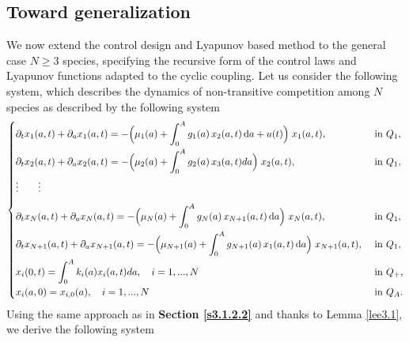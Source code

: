 \documentclass[10pt, a4paper]{amsart}
\theoremstyle{plain}
\theoremstyle{definition}
\theoremstyle{remark}
\numberwithin{equation}{section}
\begin{document}
\subsection{\bf Toward generalization}
We now extend the control design and Lyapunov based method to the general case  \texorpdfstring{$N \ge 3$}{N ≥ 3} species, specifying the recursive form of the control laws and Lyapunov functions adapted to the cyclic coupling.  Let us consider the following system, which describes the dynamics of non-transitive competition among $N$ species as described by the following system 
\begin{align}\label{aq3.145}
 \begin{cases}
\displaystyle 
\partial_t x_1(a,t) + \partial_a x_1(a,t)
= -\Bigl(\mu_1(a) 
       + \int_0^A g_1(a)\,x_2(a,t)\,\mathrm{d}a
       + u(t)\Bigr)\;x_1(a,t),
& \text{ in } Q_1,\\[8pt]
\displaystyle 
\partial_t x_2(a,t) + \partial_a x_2(a,t)
= -\Bigl(\mu_2(a) 
       + \int_0^A g_2(a)\,x_3(a,t)da\Bigr)\;x_2(a,t),
& \text{ in } Q_1,\\[8pt]
\vdots\qquad\vdots\\[8pt]
\partial_t x_{N}(a,t) + \partial_a x_{N}(a,t)
= -\Bigl(\mu_{N}(a) 
       + \displaystyle\int_0^A g_{N}(a)\,x_{N+1}(a,t)\,\mathrm{d}a
       \Bigr)\;x_{N}(a,t),
& \text{ in } Q_1,\\[8pt]
\partial_t x_{N+1}(a,t) + \partial_a x_{N+1}(a,t)
= -\Bigl(\mu_{N+1}(a) 
       + \displaystyle\int_0^A g_{N+1}(a)\,x_1(a,t)\,\mathrm{d}a
       \Bigr)\;x_{N+1}(a,t),
& \text{ in } Q_1,\\[8pt]
\displaystyle 
x_i(0,t)
= \int_0^Ak_i(a)x_i(a,t)da,\quad i=1,...,N& \text{ in } Q_+,\\[6pt]
x_i(a,0) = x_{i,0}(a),\quad i=1,...,N
& \text{ in } Q_A.
\end{cases}
\end{align}
Using the same approach as in {\bf Section \ref{s3.1.2.2}} and thanks to Lemma \ref{lee3.1}, we derive the following system
\end{document}
